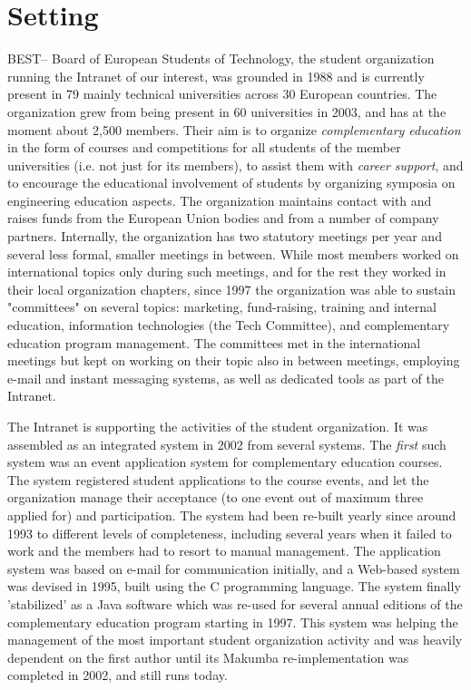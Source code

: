 \documentclass{sig-alt-release2}
\begin{document}
\section{Setting}\label{sec:setting}
BEST-- Board of European Students of Technology, the student organization running the Intranet of our interest, was grounded in 1988 and is currently present in 79 mainly technical universities across 30 European countries. The organization grew from being present in 60 universities in 2003, and has at the moment about 2,500 members. Their aim is to organize {\it complementary education} in the form of courses and competitions for all students of the member universities (i.e. not just for its members), to assist them with {\it career support}, and to encourage the educational involvement of students by organizing symposia on engineering education aspects.
The organization maintains contact with and raises funds from the European Union bodies and from a number of company partners. Internally, the organization has two statutory meetings per year and several less formal, smaller meetings in between. While most members worked on international topics only during such meetings, and for the rest they worked in their local organization chapters, since 1997 the organization was able to sustain "committees" on several topics: marketing, fund-raising, training and internal education, information technologies (the Tech Committee), and complementary education program management. The committees met in the international meetings but kept on working on their topic also in between meetings, employing e-mail and instant messaging systems, as well as dedicated tools as part of the Intranet.

The Intranet is supporting the activities of the student organization. It was assembled as an integrated system in 2002 from several systems. The {\it first} such system was an event application system for complementary education courses. The system registered student applications to the course events, and let the organization manage their acceptance (to one event out of maximum three applied for) and participation. The system had been re-built yearly since around 1993 to different levels of completeness, including several years when it failed to work and the members had to resort to manual management. The application system was based on e-mail for communication initially, and a Web-based system was devised in 1995, built using the C programming language. The system finally 'stabilized' as a Java software which was re-used for several annual editions of the complementary education program starting in 1997. This system was helping the management of the most important student organization activity and was heavily dependent on the first author until its Makumba re-implementation was completed in 2002, and still runs today.
\end{document}
